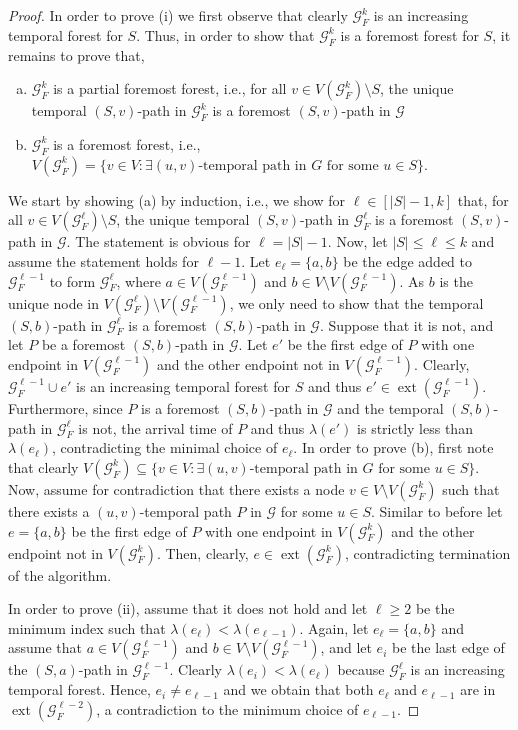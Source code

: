 \documentclass[a4paper,11pt]{article}
\theoremstyle{definition}
\theoremstyle{plain}
\newcommand{\GGG}{\mathcal{G}}
\DeclareMathOperator{\ext}{ext}
\begin{document}
\begin{proof}
  In order to prove (i) we first observe that clearly $\GGG_F^k$ is an increasing temporal forest for $S$. Thus, in order to show that $\GGG_F^k$ is a foremost forest for $S$, it remains to prove that,
  \begin{enumerate}[(a)]
    \item $\GGG_F^k$ is a partial foremost forest, i.e., for all $v\in V(\GGG_F^k) \setminus S$, the unique temporal $(S, v)$-path in $\GGG_F^k$ is a foremost $(S, v)$-path in $\GGG$
    \item $\GGG_F^k$ is a foremost forest, i.e., $V(\GGG_F^k)=\{v\in V: \exists (u, v)\text{-temporal path in $G$ for some }u\in S\}$.
  \end{enumerate}
  We start by showing (a) by induction, i.e., we show for $\ell\in [|S|-1, k]$ that, for all $v\in V(\GGG_F^\ell) \setminus S$, the unique temporal $(S, v)$-path in $\GGG_F^\ell$ is a foremost $(S, v)$-path in $\GGG$.
  The statement is obvious for $\ell=|S|-1$. Now, let $|S| \leq \ell \leq k$ and assume the statement holds for $\ell-1$.
  Let $e_\ell = \{a,b\}$ be the edge added to $\GGG^{\ell - 1}_F$ to form $\GGG^{\ell}_F$, where $a \in V(\GGG^{\ell - 1}_F)$ and $b \in V\setminus V(\GGG^{\ell - 1}_F)$.
  As $b$ is the unique node in $V(\GGG^{\ell}_F)\setminus V(\GGG^{\ell - 1}_F)$, we only need to show that the temporal
  $(S,b)$-path in $\GGG^{\ell}_F$ is a foremost $(S,b)$-path in $\GGG$.
  Suppose that it is not, and let $P$ be a foremost $(S,b)$-path in $\GGG$. Let $e'$ be the first edge of $P$ with one endpoint in $V(\GGG^{\ell - 1}_F)$ and the other endpoint not in $V(\GGG^{\ell - 1}_F)$.
  Clearly, $\GGG^{\ell - 1}_F \cup e'$ is an increasing temporal forest for $S$ and thus $e'\in \ext(\GGG^{\ell - 1}_F)$. Furthermore, since $P$ is a foremost $(S, b)$-path in $\GGG$ and the temporal $(S, b)$-path in $\GGG_F^{\ell}$ is not, the arrival time of $P$ and thus $\lambda(e')$ is strictly less than $\lambda(e_\ell)$, contradicting the minimal choice of $e_\ell$.
  In order to prove (b), first note that clearly $V(\GGG_F^k)\subseteq\{v\in V: \exists (u, v)\text{-temporal path in $G$ for some }u\in S\}$. Now, assume for contradiction that there exists a node $v\in V\setminus V(\GGG_F^k)$ such that there exists a $(u, v)$-temporal path $P$ in $\GGG$ for some $u\in S$. Similar to before let $e=\{a,b\}$ be the first edge of $P$ with one endpoint in $V(\GGG^{k}_F)$ and the other endpoint not in $V(\GGG^{k}_F)$.
  Then, clearly, $e\in \ext(\GGG_F^k)$, contradicting termination of the algorithm.

  In order to prove (ii), assume that it does not hold and let $\ell \geq 2$ be the minimum index such that
  $\lambda(e_\ell) < \lambda(e_{\ell-1})$. Again, let $e_\ell = \{a,b\}$ and assume that $a \in V(\GGG_F^{\ell - 1})$ and $b \in V\setminus V(\GGG_F^{\ell - 1})$, and  let $e_i$ be the last edge of the $(S,a)$-path in $\GGG_F^{\ell - 1}$.
  Clearly $\lambda(e_i) < \lambda(e_\ell)$ because $\GGG_F^{\ell}$ is an increasing temporal forest. Hence, $e_i \neq e_{\ell - 1}$ and we obtain that both $e_\ell$ and $e_{\ell -1}$ are in $\ext(\GGG_F^{\ell - 2})$, a contradiction to the minimum choice of $e_{\ell -1}$.
\end{proof}
\end{document}
